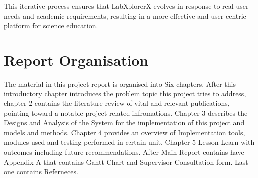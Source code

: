 This iterative process ensures that LabXplorerX evolves in response to real user needs and academic requirements, resulting in a more effective and user-centric platform for science education.
\section{Report Organisation}
The material in this project report is organised into Six chapters. After this introductory chapter introduces the problem topic this project tries to address, chapter 2 contains the literature review of vital and relevant publications, pointing toward a notable project related infromations. Chapter 3 describes the Designs and Analysis of the System for the implementation of this project and models and methods. Chapter 4 provides an overview of Implementation tools, modules used and testing performed in certain unit. Chapter 5 Lesson Learn with outcomes including future recommendations. After Main Report contains have Appendix A that contains Gantt Chart and Supervisor Consultation form. Last one contains Referneces.

